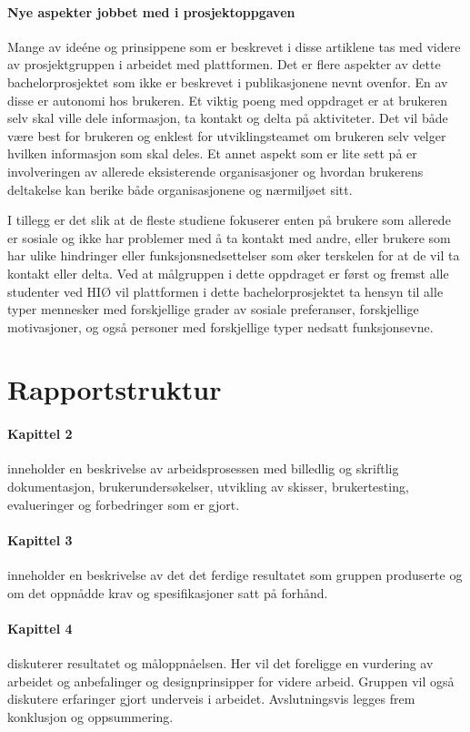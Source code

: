 \paragraph{Nye aspekter jobbet med i prosjektoppgaven}
Mange av ideéne og prinsippene som er beskrevet i disse artiklene tas med videre av prosjektgruppen i arbeidet med plattformen. Det er flere aspekter av dette bachelorprosjektet som ikke er beskrevet i publikasjonene nevnt ovenfor. En av disse er autonomi hos brukeren. Et viktig poeng med oppdraget er at brukeren selv skal ville dele informasjon, ta kontakt og delta på aktiviteter. Det vil både være best for brukeren og enklest for utviklingsteamet om brukeren selv velger hvilken informasjon som skal deles. Et annet aspekt som er lite sett på er involveringen av allerede eksisterende organisasjoner og hvordan brukerens deltakelse kan berike både organisasjonene og nærmiljøet sitt. 

I tillegg er det slik at de fleste studiene fokuserer enten på brukere som allerede er sosiale og ikke har problemer med å ta kontakt med andre, eller brukere som har ulike hindringer eller funksjonsnedsettelser som øker terskelen for at de vil ta kontakt eller delta. Ved at målgruppen i dette oppdraget er først og fremst alle studenter ved HIØ vil plattformen i dette bachelorprosjektet ta hensyn til alle typer mennesker med forskjellige grader av sosiale preferanser, forskjellige motivasjoner, og også personer med forskjellige typer nedsatt funksjonsevne.

\section{Rapportstruktur}
\paragraph{Kapittel 2} inneholder en beskrivelse av arbeidsprosessen med billedlig og skriftlig dokumentasjon, brukerundersøkelser, utvikling av skisser, brukertesting, evalueringer og forbedringer som er gjort.

\paragraph{Kapittel 3}
inneholder en beskrivelse av det det ferdige resultatet som gruppen produserte og om det oppnådde krav og spesifikasjoner satt på forhånd.

\paragraph{Kapittel 4}
diskuterer resultatet og måloppnåelsen. Her vil det foreligge en vurdering av arbeidet og anbefalinger og designprinsipper for videre arbeid. Gruppen vil også diskutere erfaringer gjort underveis i arbeidet. Avslutningsvis legges frem konklusjon og oppsummering.

